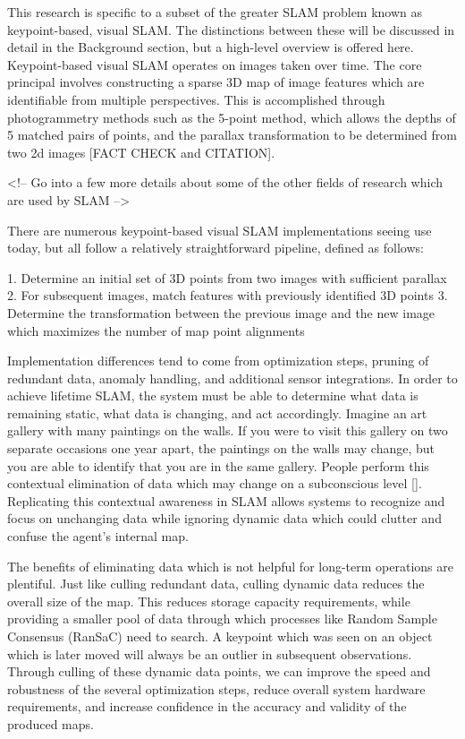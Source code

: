 This research is specific to a subset of the greater SLAM problem known as keypoint-based, visual SLAM. The distinctions between these will be discussed in detail in the Background section, but a high-level overview is offered here. Keypoint-based visual SLAM operates on images taken over time. The core principal involves constructing a sparse 3D map of image features which are identifiable from multiple perspectives. This is accomplished through photogrammetry methods such as the 5-point method, which allows the depths of 5 matched pairs of points, and the parallax transformation to be determined from two 2d images [FACT CHECK and CITATION].

<!-- Go into a few more details about some of the other fields of research which are used by SLAM -->

There are numerous keypoint-based visual SLAM implementations seeing use today, but all follow a relatively straightforward pipeline, defined as follows:

1. Determine an initial set of 3D points from two images with sufficient parallax
2. For subsequent images, match features with previously identified 3D points
3. Determine the transformation between the previous image and the new image which maximizes the number of map point alignments

Implementation differences tend to come from optimization steps, pruning of redundant data, anomaly handling, and additional sensor integrations. In order to achieve lifetime SLAM, the system must be able to determine what data is remaining static, what data is changing, and act accordingly. Imagine an art gallery with many paintings on the walls. If you were to visit this gallery on two separate occasions one year apart, the paintings on the walls may change, but you are able to identify that you are in the same gallery. People perform this contextual elimination of data which may change on a subconscious level []. Replicating this contextual awareness in SLAM allows systems to recognize and focus on unchanging data while ignoring dynamic data which could clutter and confuse the agent's internal map.

The benefits of eliminating data which is not helpful for long-term operations are plentiful. Just like culling redundant data, culling dynamic data reduces the overall size of the map. This reduces storage capacity requirements, while providing a smaller pool of data through which processes like Random Sample Consensus (RanSaC) need to search. A keypoint which was seen on an object which is later moved will always be an outlier in subsequent observations. Through culling of these dynamic data points, we can improve the speed and robustness of the several optimization steps, reduce overall system hardware requirements, and increase confidence in the accuracy and validity of the produced maps.

